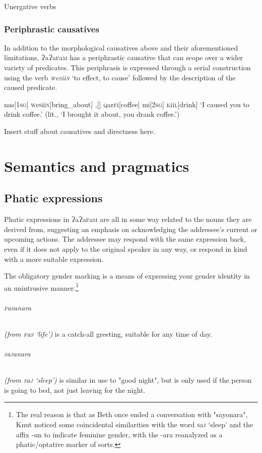 \documentclass[a4paper,10pt,twoside,openright]{memoir}
\newcommand{\lang}{ɁaɁa\textsc{f}a\textsc{m}}
\newcommand{\famword}[5]{#1\textsc{#2}#3\textsc{#4}#5}
\begin{document}
Unergative verbs

\subsection{Periphrastic causatives}

In addition to the morphological causatives above and their aforementioned limitations, \lang{} has a periphrastic causative that can scope over a wider variety of predicates. This periphrasis is expressed through a serial construction using the verb \textit{\textsc{w}\famword{e}{s}{ii}{n}{}} `to effect, to cause' followed by the description of the caused predicate. 

\ex
\begingl
nas[\textsc{1sg}]
\textsc{w}\famword{e}{s}{ii}{n}{}[bring\_about]
,[]
\famword{}{q}{ar}{f}{i}[coffee]
mi[\textsc{2sg}]
\famword{}{k}{ii}{l}{}[drink]
\glft `I caused you to drink coffee.' (lit., `I brought it about, you drank coffee.')
\endgl
\xe

Insert stuff about causatives and directness here.

\chapter{Semantics and pragmatics}
\section{Phatic expressions}

Phatic expressions in \lang{} are all in some way related to the nouns they are derived from, suggesting an emphasis on acknowledging the addressee's current or upcoming actions. The addressee may respond with the same expression back, even if it does not apply to the original speaker in any way, or respond in kind with a more suitable expression.

The obligatory gender marking is a means of expressing your gender identity in an unintrusive manner.\footnote{The real reason is that as Beth once ended a conversation with "sayonara", Knut noticed some coincidental similarities with the word \famword{}{s}{a}{j}{} `sleep' and the affix -un to indicate feminine gender, with the -ara reanalyzed as a phatic/optative marker of sorts.}

\subparagraph{\famword{}{f}{a}{s}{anara}} \textit{(from \famword{}{f}{a}{s}{} `life')} is a catch-all greeting, suitable for any time of day. 

\subparagraph{\famword{}{s}{a}{j}{anara}} \textit{(from \famword{}{s}{a}{j}{} `sleep')} is similar in use to "good night", but is only used if the person is going to bed, not just leaving for the night.
\end{document}

